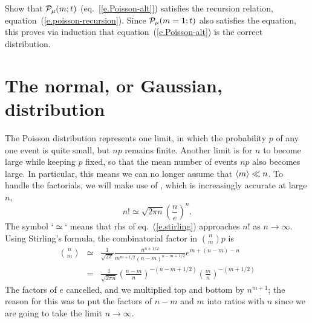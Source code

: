 \begin{sidebar}
\begin{exercisebox}
Show that $\mathcal{P}_{\mu}(m;t)$ (eq.~[\ref{e.Poisson-alt}]) satisfies the recursion relation, equation~(\ref{e.poisson-recursion}). Since $\mathcal{P}_{\mu}(m=1;t)$ also satisfies the equation, this proves via induction that equation~(\ref{e.Poisson-alt}) is the correct distribution.
\end{exercisebox}
\end{sidebar}

\section{The normal, or Gaussian, distribution}

The Poisson distribution represents one limit, in which the probability $p$ of any one event is quite small, but $np$ remains finite. Another limit is for $n$ to become large while keeping $p$ fixed, so that the mean number of events $np$ also becomes large. In particular, this means we can no longer assume that $\left\langle m\right\rangle\ll n$. To handle the factorials, we will make use of , which is increasingly accurate at large $n$,
\begin{equation}\label{e.stirling}
n! \simeq \sqrt{2\pi n}\left(\frac{n}{e}\right)^{n}.
\end{equation}
The symbol `$\simeq$` means that rhs of eq.~(\ref{e.stirling}) approaches $n!$ as $n\to\infty$.
Using Stirling's formula, the combinatorial factor in $\binom{n}{m}{p}$ is
\begin{eqnarray*}
	{n\choose m} &\simeq& \frac{1}{\sqrt{2\pi}}\frac{n^{n+1/2}}{m^{m+1/2}(n-m)^{n-m+1/2}} e^{m+(n-m)-n}\\
	&=& \frac{1}{\sqrt{2\pi n}}\left(\frac{n-m}{n}\right)^{-(n-m+1/2)} \left(\frac{m}{n}\right)^{-(m+1/2)}
\end{eqnarray*}
The factors of $e$ cancelled, and we multiplied top and bottom by $n^{m+1}$; the reason for this was to put the factors of $n-m$ and $m$ into ratios with $n$ since we are going to take the limit $n\to\infty$.


